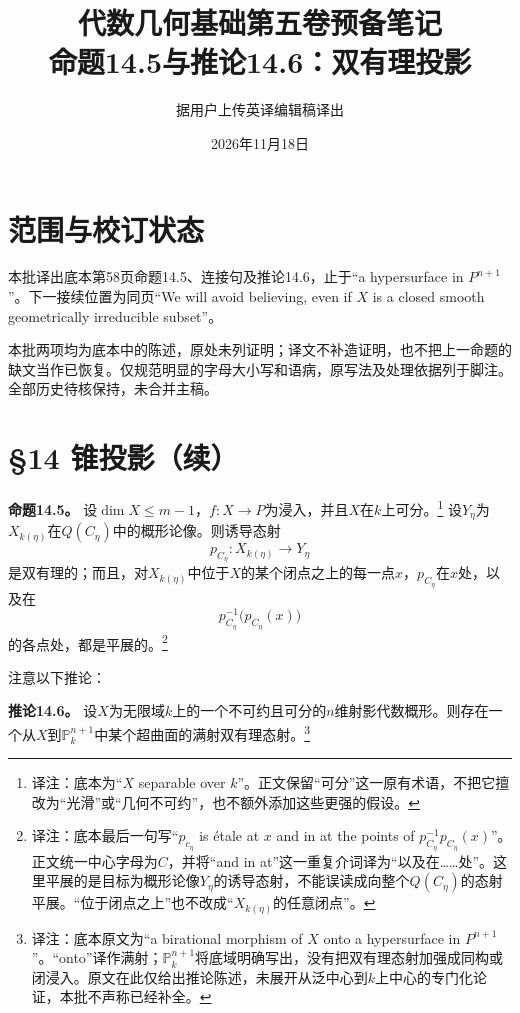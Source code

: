 \documentclass[openany,fontset=fandol]{ctexbook}
\newcommand{\note}[1]{\unskip\nobreak\footnote{译注：#1}}
\begin{document}
\title{代数几何基础第五卷预备笔记\\命题14.5与推论14.6：双有理投影}
\author{据用户上传英译编辑稿译出}
\date{2026年11月18日}
\maketitle
\chapter*{范围与校订状态}
本批译出底本第58页命题14.5、连接句及推论14.6，止于“a hypersurface in $P^{n+1}$”。下一接续位置为同页“We will avoid believing, even if $X$ is a closed smooth geometrically irreducible subset”。

本批两项均为底本中的陈述，原处未列证明；译文不补造证明，也不把上一命题的缺文当作已恢复。仅规范明显的字母大小写和语病，原写法及处理依据列于脚注。全部历史待核保持，未合并主稿。
\chapter*{§14 锥投影（续）}
\noindent\textbf{命题14.5。}
设$\dim X\leq m-1$，$f:X\to P$为浸入，并且$X$在$k$上可分。\note{底本为“$X$ separable over $k$”。正文保留“可分”这一原有术语，不把它擅改为“光滑”或“几何不可约”，也不额外添加这些更强的假设。}
设$Y_\eta$为$X_{k(\eta)}$在$Q(C_\eta)$中的概形论像。则诱导态射
\[
p_{C_\eta}:X_{k(\eta)}\longrightarrow Y_\eta
\]
是双有理的；而且，对$X_{k(\eta)}$中位于$X$的某个闭点之上的每一点$x$，$p_{C_\eta}$在$x$处，以及在
\[
p_{C_\eta}^{-1}\bigl(p_{C_\eta}(x)\bigr)
\]
的各点处，都是平展的。\note{底本最后一句写“$p_{c_\eta}$ is étale at $x$ and in at the points of $p_{C_\eta}^{-1}p_{C_\eta}(x)$”。正文统一中心字母为$C$，并将“and in at”这一重复介词译为“以及在……处”。这里平展的是目标为概形论像$Y_\eta$的诱导态射，不能误读成向整个$Q(C_\eta)$的态射平展。“位于闭点之上”也不改成“$X_{k(\eta)}$的任意闭点”。}

注意以下推论：

\noindent\textbf{推论14.6。}
设$X$为无限域$k$上的一个不可约且可分的$n$维射影代数概形。则存在一个从$X$到$\mathbb P^{n+1}_k$中某个超曲面的满射双有理态射。\note{底本原文为“a birational morphism of $X$ onto a hypersurface in $P^{n+1}$”。“onto”译作满射；$\mathbb P^{n+1}_k$将底域明确写出，没有把双有理态射加强成同构或闭浸入。原文在此仅给出推论陈述，未展开从泛中心到$k$上中心的专门化论证，本批不声称已经补全。}
\end{document}
